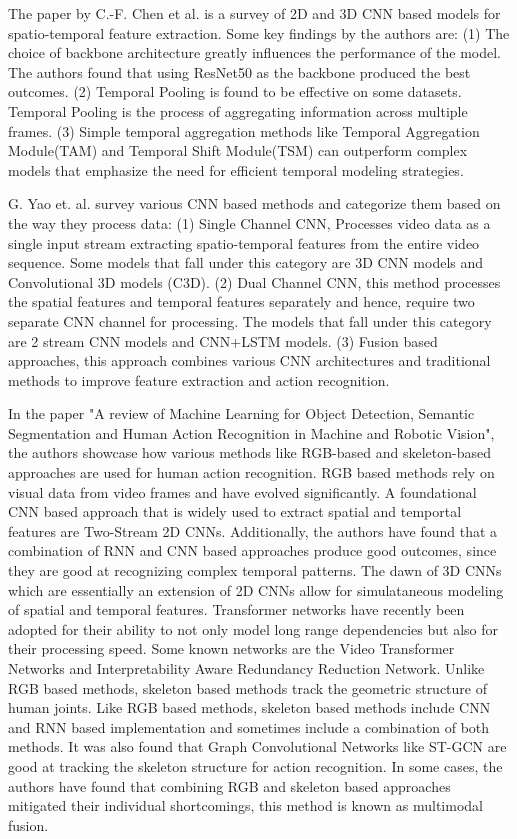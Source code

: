 \documentclass[12pt]{report}
\begin{document}
	\cite{c_f_chen} The paper by C.-F. Chen et al. is a survey of 2D and 3D CNN based models for spatio-temporal feature extraction. Some key findings by the authors are: (1) The choice of backbone architecture greatly influences the performance of the model. The authors found that using ResNet50 as the backbone produced the best outcomes. (2) Temporal Pooling is found to be effective on some datasets. Temporal Pooling is the process of aggregating information across multiple frames. (3) Simple temporal aggregation methods like Temporal Aggregation Module(TAM) and Temporal Shift Module(TSM) can outperform complex models that emphasize the need for efficient temporal modeling strategies.
	
	\cite{g-yao} G. Yao et. al. survey various CNN based methods and categorize them based on the way they process data: (1) Single Channel CNN, Processes video data as a single input stream extracting spatio-temporal features from the entire video sequence. Some models that fall under this category are 3D CNN models and Convolutional 3D models (C3D). (2) Dual Channel CNN, this method processes the spatial features and temporal features separately and hence, require two separate CNN channel for processing. The models that fall under this category are 2 stream CNN models and CNN+LSTM models. (3) Fusion based approaches, this approach combines various CNN architectures and traditional methods to improve feature extraction and action recognition.
	
	\cite{manakitsa} In the paper "A review of Machine Learning for Object Detection, Semantic Segmentation and Human Action Recognition in Machine and Robotic Vision", the authors showcase how various methods like RGB-based and skeleton-based approaches are used for human action recognition. RGB based methods rely on visual data from video frames and have evolved significantly. A foundational CNN based approach that is widely used to extract spatial and temportal features are Two-Stream 2D CNNs. Additionally, the authors have found that a combination of RNN and CNN  based approaches produce good outcomes, since they are good at recognizing complex temporal patterns. The dawn of 3D CNNs which are essentially an extension of 2D CNNs allow for simulataneous modeling of spatial and temporal features. Transformer networks have recently been adopted for their ability to not only model long range dependencies but also for their processing speed.  Some known networks are the Video Transformer Networks and Interpretability Aware Redundancy Reduction Network. Unlike RGB based methods, skeleton based methods track the geometric structure of human joints. Like RGB based methods, skeleton based methods include CNN and RNN based implementation and sometimes include a combination of both methods. It was also found that Graph Convolutional Networks like ST-GCN are good at tracking the skeleton structure for action recognition. In some cases, the authors have found that combining RGB and skeleton based approaches mitigated their individual shortcomings, this method is known as multimodal fusion.
	
\end{document}
